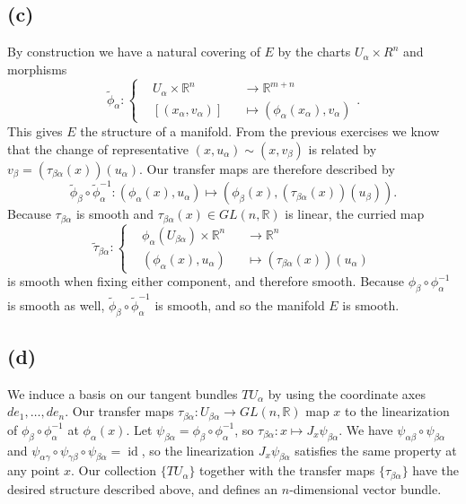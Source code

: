 \documentclass[english]{article}
\DeclareMathOperator{\id}{id}
\begin{document}
\subsection*{(c)}
By construction we have a natural covering of $E$ by the charts $U_\alpha\times R^n$ and morphisms
\begin{equation*}
        \tilde \phi_\alpha\colon\left\{\begin{aligned}
            &U_\alpha\times \mathbb R^n 
            &&\to \mathbb R^{m + n}\\
            &[(x_\alpha,v_\alpha)]
            &&\mapsto (\phi_\alpha(x_\alpha), v_\alpha)
        \end{aligned}\right..
\end{equation*}
This gives $E$ the structure of a manifold.
From the previous exercises we know that the change of representative $(x,u_\alpha)\sim (x,v_\beta)$ is related by
$v_\beta=(\tau_{\beta\alpha}(x))(u_\alpha)$.
Our transfer maps are therefore described by
\begin{equation*}
    \tilde \phi_\beta\circ\tilde\phi_\alpha^{-1}\colon (\phi_\alpha(x),u_\alpha)\mapsto (\phi_\beta(x),(\tau_{\beta\alpha}(x))(u_\beta)).
\end{equation*}
Because $\tau_{\beta\alpha}$ is smooth and $\tau_{\beta\alpha}(x)\in GL(n,\mathbb R)$ is linear,
the curried map
\begin{equation*}
    \tilde\tau_{\beta\alpha}\colon \left\{\begin{aligned}
        &\phi_\alpha(U_{\beta\alpha})\times \mathbb R^n
        &&\to \mathbb R^n\\
        &(\phi_\alpha(x),u_\alpha)
        &&\mapsto (\tau_{\beta\alpha}(x))(u_\alpha)
    \end{aligned}
    \right.
\end{equation*}
is smooth when fixing either component, and therefore smooth.
Because $\phi_\beta\circ\phi_\alpha^{-1}$ is smooth as well, $\tilde\phi_\beta\circ\tilde\phi_\alpha^{-1}$ is smooth,
and so the manifold $E$ is smooth.

\subsection*{(d)}
We induce a basis on our tangent bundles $TU_\alpha$ by using the coordinate axes $de_1,\ldots,de_n$.
Our transfer maps $\tau_{\beta\alpha}\colon U_{\beta\alpha}\to GL(n,\mathbb R)$ map
$x$ to the linearization of $\phi_\beta\circ\phi_\alpha^{-1}$ at $\phi_\alpha(x)$.
Let $\psi_{\beta\alpha}=\phi_\beta\circ \phi_\alpha^{-1}$, so $\tau_{\beta\alpha}\colon x\mapsto J_x\psi_{\beta\alpha}$.
We have $\psi_{\alpha\beta}\circ\psi_{\beta\alpha}$ and $\psi_{\alpha\gamma}\circ\psi_{\gamma\beta}\circ\psi_{\beta\alpha}=\id$,
so the linearization $J_x\psi_{\beta\alpha}$ satisfies the same property at any point $x$.
Our collection $\{TU_\alpha\}$ together with the transfer maps $\{\tau_{\beta\alpha}\}$ have the desired structure described above,
and defines an $n$-dimensional vector bundle.
\end{document}
